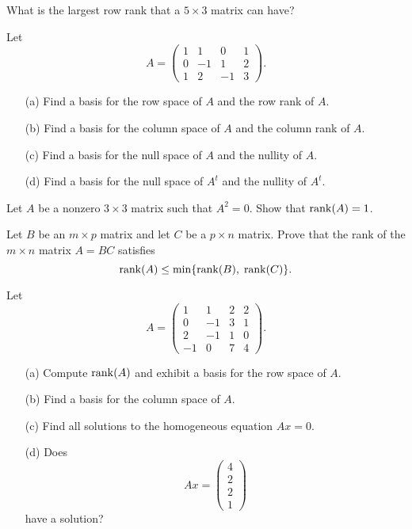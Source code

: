 \begin{exercise} \label{c5.8.2}
What is the largest row rank that a $5\times 3$ matrix can have?
\end{exercise}

\begin{exercise} \label{c5.8.3}
Let
\[
A = \left(\begin{array}{rrrr} 1 & 1 & 0 & 1\\ 0 & -1 & 1 & 2\\
1 & 2 & -1 & 3 \end{array}\right).
\]
\begin{itemize}
\item[(a)]  Find a basis for the row space of $A$ and the row rank of $A$.
\item[(b)]  Find a basis for the column space of $A$ and the column rank of
$A$.
\item[(c)]  Find a basis for the null space of $A$ and the nullity of $A$.
\item[(d)]  Find a basis for the null space of $A^t$ and the nullity of $A^t$.
\end{itemize}
\end{exercise}

\begin{exercise} \label{c5.8.4}
Let $A$ be a nonzero $3\times 3$ matrix such that $A^2=0$.  Show that
${\rm rank}(A)=1$.
\end{exercise}

\begin{exercise} \label{c5.8.5}
Let $B$ be an $m\times p$ matrix and let $C$ be a $p\times n$
matrix. Prove that the rank of the $m\times n$ matrix $A=BC$
satisfies
\[
{\rm rank}(A) \leq \min\{{\rm rank}(B),\;{\rm rank}(C)\}.
\]
\end{exercise}



\CEXER

\begin{exercise} \label{c5.8.6}
Let
\begin{equation*}
A = \left(\begin{array}{rrrr} 1 & 1 & 2 & 2 \\ 0 & -1 & 3 & 1 \\
   2 & -1 & 1 & 0 \\ -1 & 0 & 7 & 4 \end{array}\right).
\end{equation*}
\begin{itemize}
\item[(a)]  Compute ${\rm rank}(A)$ and exhibit a basis for the row space of $A$.
\item[(b)]  Find a basis for the column space of $A$.
\item[(c)]  Find all solutions to the homogeneous equation $Ax=0$.
\item[(d)]  Does
\[
Ax = \left( \begin{array}{c} 4 \\ 2\\ 2\\ 1 \end{array} \right)
\]
have a solution?
\end{itemize}
\end{exercise}


